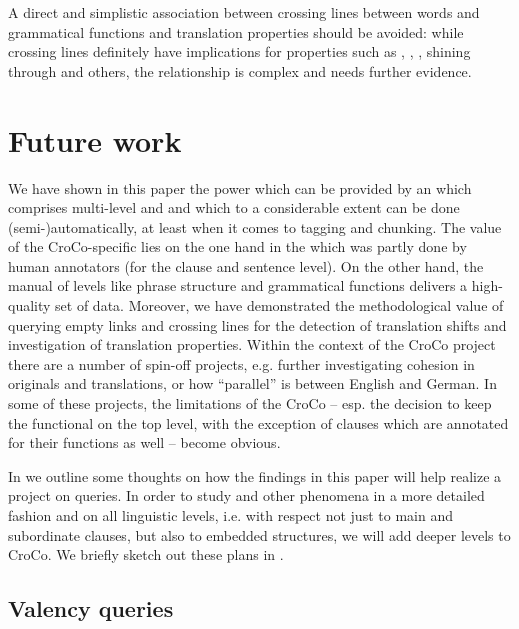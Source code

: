 \documentclass[output=paper]{LSP/langsci}
\begin{document}
A direct and simplistic association between crossing lines between words and grammatical functions and translation properties should be avoided: while crossing lines definitely have implications for properties such as , , , shining through and others, the relationship is complex and needs further evidence.


\section{Future work}\label{sec:culo:5}

We have shown in this paper the  power which can be provided by an  which comprises multi-level  and  and which to a considerable extent can be done (semi-)automatically, at least when it comes to tagging and chunking. The value of the CroCo-specific  lies on the one hand in the  which was partly done by human annotators (for the clause and sentence level). On the other hand, the manual  of levels like phrase structure and grammatical functions delivers a high-quality set of data. Moreover, we have demonstrated the methodological value of querying empty links and crossing lines for the detection of translation shifts and investigation of translation properties. Within the context of the CroCo project there are a number of spin-off projects, e.g. further investigating cohesion in originals and translations, or how ``parallel''  is between English and German. In some of these projects, the limitations of the CroCo  -- esp. the decision to keep the functional  on the top level, with the exception of clauses which are annotated for their functions as well -- become obvious.

In  we outline some thoughts on how the findings in this paper will help realize a project on  queries. In order to study  and other phenomena in a more detailed fashion and on all linguistic levels, i.e. with respect not just to main and subordinate clauses, but also to embedded structures, we will add deeper  levels to CroCo. We briefly sketch out these plans in .

\subsection{Valency queries}\label{sec:culo:5.1}
\end{document}
